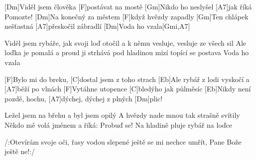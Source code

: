 
[Dm]Viděl jsem člověka [F]postávat na mostě
[Gm]Nikdo ho neslyšel [A7]jak říká Pomozte!
[Dm]Na konečný za městem [F]když hvězdy zapadly
[Gm]Ten chlápek nešťastná [A7]přeskočil zábradlí
[Dm]Voda ho vzala[Gmi,A7]

Viděl jsem rybáře, jak svoji loď otočil
a k němu vesluje, vesluje ze všech sil
Ale loďka je pomalá a proud ji strhává
pod hladinou mizí topící se postava
Voda ho vzala

[F]Bylo mi do breku, [C]dostal jsem z toho strach
[Eb]Ale rybář z lodi vyskočí a [A7]běží po vlnách
[F]Vytáhne utopence [C]bledýho jak půlměsíc
[Eb]Nikdy není pozdě, hochu, [A7]dýchej, dýchej z plných [Dm]plic!

Ležel jsem na břehu a byl jsem opilý
A hvězdy nade mnou tak strašně svítily
Někdo mě volá jménem a říká: Probuď se!
Na hladině pluje rybář na loďce

/:Otevírám svoje oči, řasy vodou slepené
ještě se mi nechce umřít, Pane Bože ještě ne!:/
